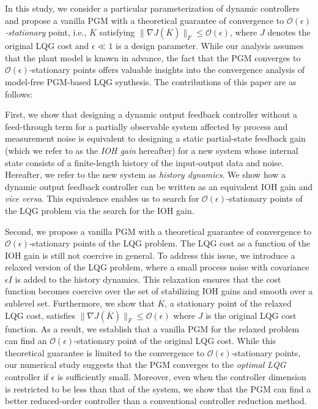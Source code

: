 \documentclass[preprint,5p,times,twocolumn]{elsarticle}
\begin{document}
In this study, we consider a particular parameterization of dynamic controllers and propose a vanilla PGM with a theoretical guarantee of convergence to {\it $\mathcal{O}(\epsilon)$‑stationary} point, i.e., $\overline{K}$ satisfying $\|\nabla J(\overline{K})\|_F \le \mathcal{O}(\epsilon)$, where $J$ denotes the original LQG cost and $\epsilon \ll 1$ is a design parameter. While our analysis assumes that the plant model is known in advance, the fact that the PGM converges to $\mathcal{O}(\epsilon)$‑stationary points offers valuable insights into the convergence analysis of model-free PGM-based LQG synthesis. The contributions of this paper are as follows:

First, we show that designing a dynamic output feedback controller without a feed-through term for a partially observable system affected by process and measurement noise is equivalent to designing a static partial-state feedback gain (which we refer to as the {\it IOH gain} hereafter) for a new system whose internal state consists of a finite-length history of the input-output data and noise. Hereafter, we refer to the new system as {\it history dynamics}. We show how a dynamic output feedback controller can be written as an equivalent IOH gain and \emph{vice versa}. This equivalence enables us to search for $\mathcal O(\epsilon)$-stationary points of the LQG problem via the search for the IOH gain. 

Second, we propose a vanilla PGM with a theoretical guarantee of convergence to $\mathcal O(\epsilon)$-stationary points of the LQG problem. The LQG cost as a function of the IOH gain is still not coercive in general. To address this issue, we introduce a relaxed version of the LQG problem, where a small process noise with covariance $\epsilon I$ is added to the history dynamics. This relaxation ensures that the cost function becomes coercive over the set of stabilizing IOH gains and smooth over a sublevel set. Furthermore, we show that $\overline{K}$, a stationary point of the relaxed LQG cost, satisfies $\|\nabla J(\overline{K})\|_F \leq \mathcal{O}(\epsilon)$ where $J$ is the original LQG cost function. As a result, we establish that a vanilla PGM for the relaxed problem can find an $\mathcal{O}(\epsilon)$-stationary point of the original LQG cost. While this theoretical guarantee is limited to the convergence to $\mathcal O(\epsilon)$-stationary points, our numerical study suggests that the PGM converges to the {\it optimal LQG} controller if $\epsilon$ is sufficiently small. Moreover, even when the controller dimension is restricted to be less than that of the system, we show that the PGM can find a better reduced-order controller than a conventional controller reduction method.
\end{document}
